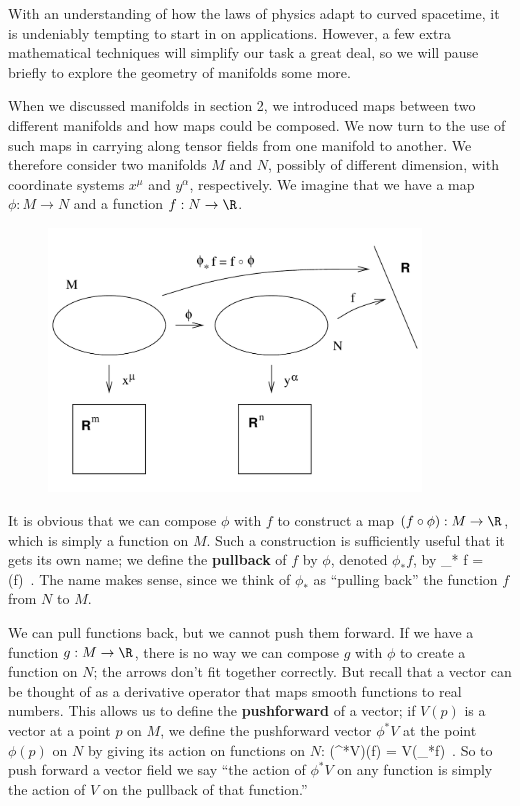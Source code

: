 \documentclass[12pt]{article}
\begin{document}
With an understanding of how the laws of physics adapt to curved
spacetime, it is undeniably tempting to start in on applications.  
However, a few extra mathematical techniques will simplify our task a 
great deal, so we will pause briefly to explore the geometry of manifolds
some more.

When we discussed manifolds in section 2, we introduced maps
between two different manifolds and how maps could be composed.  We
now turn to the use of such maps in carrying along tensor fields 
from one manifold to another.  We therefore consider two manifolds
$M$ and $N$, possibly of different dimension, with coordinate systems
$x^\mu$ and $y^\alpha$, respectively.  We imagine that we have a
map $\phi:M\rightarrow N$ and a function $f:N\rightarrow \R$.

\begin{figure}[h]
  \centerline{
  \includegraphics[height=7cm]{pdf/five1}}
\end{figure}

\noindent It is obvious that we can compose $\phi$ with $f$ to 
construct a map $(f\circ\phi):M\rightarrow\R$, which is simply
a function on $M$.  Such a construction is sufficiently useful that
it gets its own name; we define the {\bf pullback} of $f$ by $\phi$,
denoted $\phi_*f$, by
\be
  \phi_* f = (f\circ\phi)\ .\label{5.1}
\ee
The name makes sense, since we think of $\phi_*$ as ``pulling back''
the function $f$ from $N$ to $M$.

We can pull functions back, but we cannot push them forward.  If
we have a function $g:M\rightarrow\R$, there is no way we can compose
$g$ with $\phi$ to create a function on $N$; the arrows don't fit 
together correctly.  But recall that a vector can be thought of
as a derivative operator that maps smooth functions to real numbers.
This allows us to define the {\bf pushforward} of a vector; if $V(p)$ is 
a vector at a point $p$ on $M$, we define the pushforward vector $\phi^*V$ 
at the point $\phi(p)$ on $N$ by giving its action on functions on $N$:
\be
  (\phi^*V)(f) = V(\phi_*f)\ .\label{5.2}
\ee
So to push forward a vector field we say ``the action of
$\phi^*V$ on any function is simply the action of $V$ on the pullback
of that function.''
\end{document}
